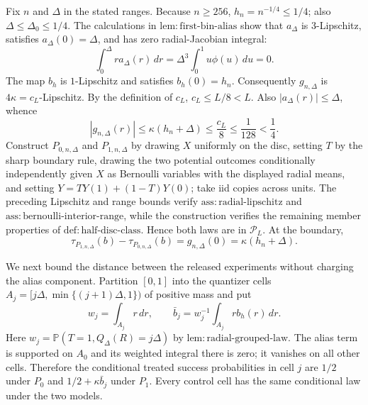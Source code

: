 Fix \(n\) and \(\Delta\) in the stated ranges.  Because \(n\ge256\), \(h_n=n^{-1/4}\le1/4\); also \(\Delta\le\Delta_0\le1/4\).  The calculations in \(\mathrm{lem:first\text{-}bin\text{-}alias}\) show that \(a_\Delta\) is \(3\)-Lipschitz, satisfies \(a_\Delta(0)=\Delta\), and has zero radial-Jacobian integral:
\[
 \int_0^\Delta r a_\Delta(r)\,dr
 =\Delta^3\int_0^1u\phi(u)\,du=0.
\]
The map \(b_h\) is \(1\)-Lipschitz and satisfies \(b_h(0)=h_n\).  Consequently \(g_{n,\Delta}\) is \(4\kappa=c_L\)-Lipschitz.  By the definition of \(c_L\), \(c_L\le L/8<L\).  Also \(|a_\Delta(r)|\le\Delta\), whence
\[
 |g_{n,\Delta}(r)|\le\kappa(h_n+\Delta)
 \le\frac{c_L}{8}\le\frac1{128}<\frac14.
\]
Construct \(P_{0,n,\Delta}\) and \(P_{1,n,\Delta}\) by drawing \(X\) uniformly on the disc, setting \(T\) by the sharp boundary rule, drawing the two potential outcomes conditionally independently given \(X\) as Bernoulli variables with the displayed radial means, and setting \(Y=TY(1)+(1-T)Y(0)\); take iid copies across units.  The preceding Lipschitz and range bounds verify \(\mathrm{ass:radial\text{-}lipschitz}\) and \(\mathrm{ass:bernoulli\text{-}interior\text{-}range}\), while the construction verifies the remaining member properties of \(\mathrm{def:half\text{-}disc\text{-}class}\).  Hence both laws are in \(\mathcal P_L\).  At the boundary,
\[
 \tau_{P_{1,n,\Delta}}(b)-\tau_{P_{0,n,\Delta}}(b)
 =g_{n,\Delta}(0)=\kappa(h_n+\Delta).
\]

We next bound the distance between the released experiments without charging the alias component.  Partition \([0,1]\) into the quantizer cells \(A_j=[j\Delta,\min\{(j+1)\Delta,1\})\) of positive mass and put
\[
 w_j=\int_{A_j}r\,dr,
 \qquad
 \bar b_j=w_j^{-1}\int_{A_j}r b_h(r)\,dr.
\]
Here \(w_j=\mathbb P(T=1,Q_\Delta(R)=j\Delta)\) by \(\mathrm{lem:radial\text{-}grouped\text{-}law}\).  The alias term is supported on \(A_0\) and its weighted integral there is zero; it vanishes on all other cells.  Therefore the conditional treated success probabilities in cell \(j\) are \(1/2\) under \(P_0\) and \(1/2+\kappa\bar b_j\) under \(P_1\).  Every control cell has the same conditional law under the two models.

